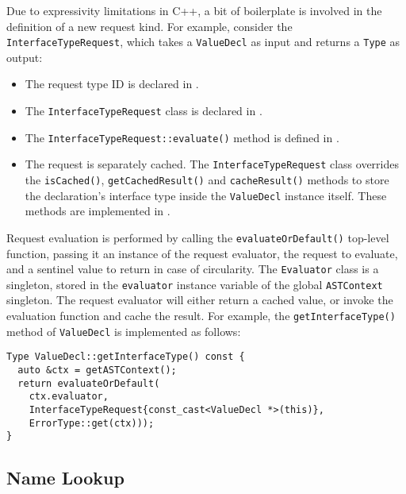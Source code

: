 \documentclass[../generics]{subfiles}
\begin{document}
Due to expressivity limitations in C++, a bit of boilerplate is involved in the definition of a new request kind. For example, consider the \texttt{InterfaceTypeRequest}, which takes a \texttt{ValueDecl} as input and returns a \texttt{Type} as output:
\begin{itemize}
\item \begingroup \raggedright The request type ID is declared in .
\item The \texttt{InterfaceTypeRequest} class is declared in .
\item The \texttt{InterfaceTypeRequest::evaluate()} method is defined in .
\item \endgroup The request is separately cached. The \texttt{InterfaceTypeRequest} class overrides the \texttt{isCached()}, \texttt{getCachedResult()} and \texttt{cacheResult()} methods to store the declaration's interface type inside the \texttt{ValueDecl} instance itself. These methods are implemented in .
\end{itemize}

Request evaluation is performed by calling the \texttt{evaluateOrDefault()} top-level function, passing it an instance of the request evaluator, the request to evaluate, and a sentinel value to return in case of circularity. The \texttt{Evaluator} class is a singleton, stored in the \texttt{evaluator} instance variable of the global \texttt{ASTContext} singleton. The request evaluator will either return a cached value, or invoke the evaluation function and cache the result. For example, the \texttt{getInterfaceType()} method of \texttt{ValueDecl} is implemented as follows:
\begin{Verbatim}
Type ValueDecl::getInterfaceType() const {
  auto &ctx = getASTContext();
  return evaluateOrDefault(
    ctx.evaluator,
    InterfaceTypeRequest{const_cast<ValueDecl *>(this)},
    ErrorType::get(ctx)));
}
\end{Verbatim}

\subsection*{Name Lookup}
\end{document}
